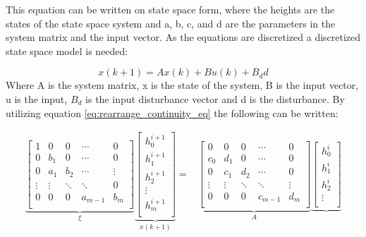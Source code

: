This equation can be written on state space form, where the heights are the states of the state space system and a, b, c, and d are the parameters in the system matrix and the input vector. As the equations are discretized a discretized state space model is needed: 

\begin{equation}
	x(k+1) = Ax(k) + Bu(k) + B_dd
\end{equation}
Where A is the system matrix, x is the state of the system, B is the input vector, u is the input, $B_d$ is the input disturbance vector and d is the disturbance. By utilizing equation \ref{eq:rearrange_continuity_eq} the following can be written:

\begin{equation}
\begin{aligned}
	   \underbrace{\begin{bmatrix}
	    	1 & 0    & 0    &\cdots &0\\
	    	0 & b_1  & 0    &\cdots &0\\
	    	0 &a_{1} & b_2  &\cdots &\vdots	  \\
	    \vdots&\vdots&\ddots&\ddots & 0  \\
	        0 & 0    &0  	&a_{m-1}&  b_m\\
	   \end{bmatrix}}_{\xi}
	    \underbrace{\begin{bmatrix}
		h_{0}^{i+1}\\
		h_{1}^{i+1} \\
		h_{2}^{i+1} \\			
		\vdots		\\
		h_{m}^{i+1}\\
	\end{bmatrix}}_{x(k+1)}
	=& 
	\underbrace{\begin{bmatrix}
	    	0 &  0   &   0    & \cdots   &0\\
	    c_{0} & d_1  &   0    &  \cdots  &0\\
	    0	  &c_{1} & d_2    & \cdots   &0 \\
	    \vdots&\vdots&\ddots  & \ddots   & \vdots\\
	    0	  & 0    &  0     &  c_{m-1} &  d_m\\
	    \end{bmatrix}}_{A}
	    	\underbrace{\begin{bmatrix}
		h_{0}^{i} \\
		h_{1}^{i} \\
		h_{2}^{i}\\
		\vdots		\\

\end{bmatrix}}
\end{aligned}
\end{equation}
